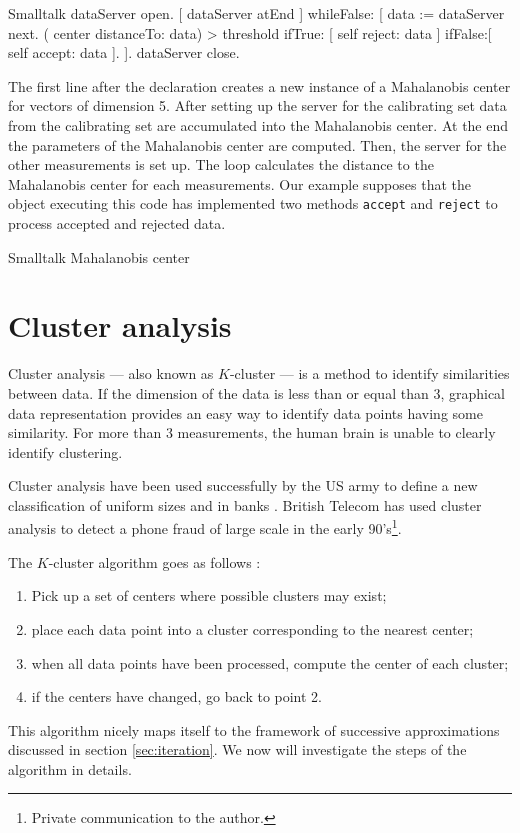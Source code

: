 {

\begin{listing}{Smalltalk}
  { }
  dataServer open.
 [ dataServer atEnd ]
      whileFalse: [ data := dataServer next.
                    ( center distanceTo: data) > threshold
                        ifTrue: [ self reject: data ]
                        ifFalse:[ self accept: data ].
                  ].
 dataServer close.
\end{listing}

The first line after the declaration creates a new instance of a
Mahalanobis center for vectors of dimension 5. After setting up
the server for the calibrating set data from the calibrating set
are accumulated into the Mahalanobis center. At the end the
parameters of the Mahalanobis center are computed. Then, the
server for the other measurements is set up. The loop calculates
the distance to the Mahalanobis center for each measurements. Our
example supposes that the object executing this code has
implemented two methods \texttt{accept} and \texttt{reject} to process
accepted and rejected data.

\begin{listing} Smalltalk Mahalanobis center  \label{ls:mahalanobis}

\end{listing}

\section{Cluster analysis}
\label{sec:cluster} Cluster analysis --- also known as $K$-cluster
--- is a method to identify similarities between data. If the
dimension of the data is less than or equal than 3, graphical data
representation provides an easy way to identify data points having
some similarity. For more than 3 measurements, the human brain is
unable to clearly identify clustering.

Cluster analysis have been used successfully by the US army to
define a new classification of uniform sizes and in banks
\cite{BerLin}. British Telecom has used cluster analysis to detect
a phone fraud of large scale in the early 90's\footnote{Private
communication to the author.}.

\noindent The $K$-cluster algorithm goes as follows \cite{BerLin}:
\begin{enumerate}
  \item Pick up a set of centers where possible clusters may
  exist;
  \item place each data point into a cluster corresponding to the
  nearest center;
  \item when all data points have been processed, compute the
  center of each cluster;
  \item if the centers have changed, go back to point 2.
\end{enumerate}
This algorithm nicely maps itself to the framework of successive
approximations discussed in section \ref{sec:iteration}. We now
will investigate the steps of the algorithm in details.

}
